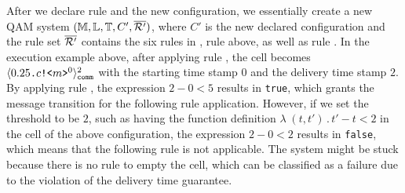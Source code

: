 After we declare rule  and the new configuration, we essentially create a new QAM system $(\mathbb{M},\mathbb{L},\mathbb{T},C',\overline{\mathcal{R}'})$,
where $C'$ is the new declared configuration and the rule set $\overline{\mathcal{R}'}$ contains the six rules in , rule  above, as well as rule .
In the execution example above, after applying rule , the  cell becomes $\langle 0.25\texttt{.}c\texttt{!<}m\texttt{>}^0 \rangle^{2}_{\texttt{comm}}$ with the starting time stamp $0$ and the delivery time stamp $2$.
By applying rule , the expression $2-0 < 5$ results in \texttt{true}, which grants the message transition for the following  rule application. 
However, if we set the threshold to be $2$, such as having the function definition $\lambda\;(t,t')\,.\,t'-t<2$ in the  cell of the above configuration, the expression $2-0 < 2$ results in \texttt{false}, which means that the following  rule is not applicable.
The system might be stuck because there is no rule to empty the  cell, which can be classified as a failure due to the violation of the delivery time guarantee. 










